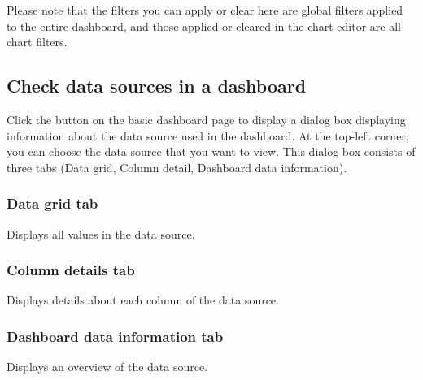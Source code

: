 \documentclass[letterpaper,10pt,english]{sphinxmanual}
\begin{document}
Please note that the filters you can apply or clear here are global filters applied to the entire dashboard, and those applied or cleared in the chart editor are all chart filters.


\subsection{Check data sources in a dashboard}
\label{\detokenize{discovery/part04/display_a_data_source:id1}}\label{\detokenize{discovery/part04/display_a_data_source::doc}}
Click the  button on the basic dashboard page to display a dialog box displaying information about the data source used in the dashboard. At the top-left corner, you can choose the data source that you want to view. This dialog box consists of three tabs (Data grid, Column detail, Dashboard data information).


\subsubsection{Data grid tab}
\label{\detokenize{discovery/part04/display_a_data_source:id2}}
Displays all values in the data source.
\begin{quote}

\begin{figure}[H]
\centering

\noindent{}
\end{figure}
\end{quote}


\subsubsection{Column details tab}
\label{\detokenize{discovery/part04/display_a_data_source:id3}}
Displays details about each column of the data source.
\begin{quote}

\begin{figure}[H]
\centering

\noindent{}
\end{figure}
\end{quote}


\subsubsection{Dashboard data information tab}
\label{\detokenize{discovery/part04/display_a_data_source:id4}}
Displays an overview of the data source.
\begin{quote}

\begin{figure}[H]
\centering

\noindent{}
\end{figure}
\end{quote}
\end{document}
